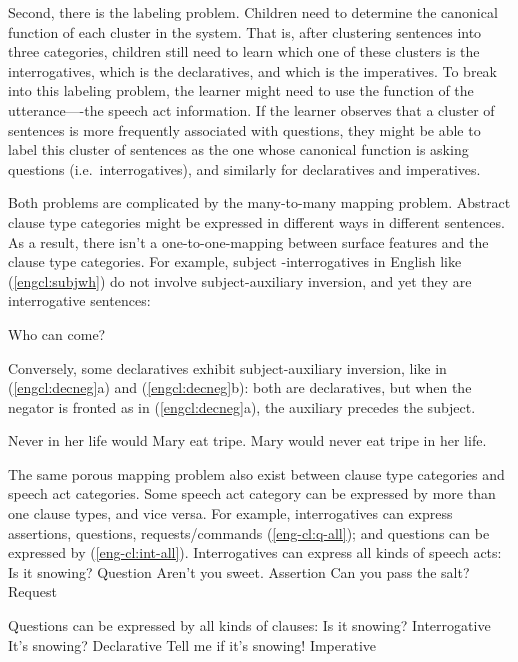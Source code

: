 Second, there is the labeling problem. Children need to determine the canonical function of each cluster in the system. That is, after clustering sentences into three categories, children still need to learn which one of these clusters is the interrogatives, which is the declaratives, and which is the imperatives. To break into this labeling problem, the learner might need to use the function of the utterance—-the speech act information. If the learner observes that a cluster of sentences is more frequently associated with questions, they might be able to label this cluster of sentences as the one whose canonical function is asking questions (i.e.\ interrogatives), and similarly for declaratives and imperatives. 

Both problems are complicated by the many-to-many mapping problem. Abstract clause type categories might be expressed in different ways in different sentences. As a result, there isn’t a one-to-one-mapping between surface features and the clause type categories. For example, subject \twh-interrogatives in English like (\ref{engcl:subjwh}) do not involve subject-auxiliary inversion, and yet they are interrogative sentences:

Who can come?
\eex

Conversely, some declaratives exhibit subject-auxiliary inversion, like in (\ref{engcl:decneg}a) and (\ref{engcl:decneg}b): both are declaratives, but when the negator  is fronted as in (\ref{engcl:decneg}a), the auxiliary precedes the subject.

\bxl{}
Never in her life would Mary eat tripe.
\ex
Mary would never eat tripe in her life. 
\exl
\eex

The same porous mapping problem also exist between clause type categories and speech act categories. Some speech act category can be expressed by more than one clause types, and vice versa. For example, interrogatives can express assertions, questions, requests/commands (\ref{eng-cl:q-all}); and questions can be expressed by \diis{} (\ref{eng-cl:int-all}).
Interrogatives can express all kinds of speech acts:
\bxl Is it snowing? \hfill Question
\ex Aren't you sweet. \hfill Assertion
\ex Can you pass the salt? \hfill Request
\exl
\eex

Questions can be expressed by all kinds of clauses:
\bxl
Is it snowing? \hfill Interrogative
\ex It's snowing? \hfill Declarative
\ex Tell me if it's snowing! \hfill Imperative
\exl
\eex

